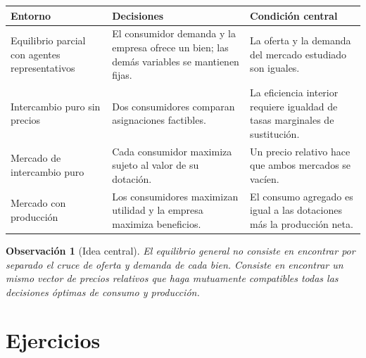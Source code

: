 \documentclass[12pt]{article}
\theoremstyle{cideplain}
\theoremstyle{cidedef}
\newtheorem{remark}[theorem]{Observación}
\begin{document}
\begin{center}
\small
\begin{tabular}{p{}p{}p{}}
\hline
Entorno & Decisiones & Condición central\\
\hline
Equilibrio parcial con agentes representativos
& El consumidor demanda y la empresa ofrece un bien; las demás variables se mantienen
fijas.
& La oferta y la demanda del mercado estudiado son iguales.\\[0.4em]
Intercambio puro sin precios
& Dos consumidores comparan asignaciones factibles.
& La eficiencia interior requiere igualdad de tasas marginales de sustitución.\\[0.4em]
Mercado de intercambio puro
& Cada consumidor maximiza sujeto al valor de su dotación.
& Un precio relativo hace que ambos mercados se vacíen.\\[0.4em]
Mercado con producción
& Los consumidores maximizan utilidad y la empresa maximiza beneficios.
& El consumo agregado es igual a las dotaciones más la producción neta.\\
\hline
\end{tabular}
\end{center}

\begin{remark}[Idea central]
El equilibrio general no consiste en encontrar por separado el cruce de oferta y demanda
de cada bien. Consiste en encontrar un mismo vector de precios relativos que haga
mutuamente compatibles todas las decisiones óptimas de consumo y producción.
\end{remark}

\section{Ejercicios}
\end{document}
